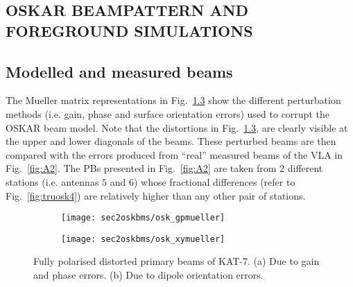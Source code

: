 \begin{appendices}
 

\chapter{OSKAR BEAMPATTERN AND FOREGROUND SIMULATIONS} %
\label{appendix:A1}
\section{Modelled and measured beams}  \label{sec:A}

The Mueller matrix representations in Fig.~\ref{fig:A1} show the  different perturbation methods (i.e. gain, phase and surface orientation errors) used to corrupt the OSKAR beam model. Note that the distortions in Fig.~\ref{fig:A1}, are clearly visible at the upper and lower diagonals of the beams.
These perturbed beams are then compared with the errors produced from \enquote{real} measured beams of the VLA in Fig.~\ref{fig:A2}. %
The PBs presented in Fig.~\ref{fig:A2} are taken from 2 different stations (i.e. antennas $5$ and $6$) whose fractional differences (refer to Fig.~\ref{fig:truosk4}) 
are relatively higher than any other pair of stations.


 \begin{figure}
 \begin{minipage}[!b]{\linewidth}
  \centering
     \begin{subfigure}[b]{0.8\textwidth}
                \texttt{[image: sec2oskbms/osk\_gpmueller]}
                \caption{}
                \label{fig:A1a}
        \end{subfigure}
        \begin{subfigure}[b]{0.8\textwidth}
                \texttt{[image: sec2oskbms/osk\_xymueller]}
                \caption{}
               \label{fig:A1b}
        \end{subfigure}
         \end{minipage}
        \caption{Fully polarised distorted primary beams of KAT-7. (a) Due to gain and phase errors.  (b) Due to dipole orientation errors.}
	    \label{fig:A1}
  \end{figure}
  \FloatBarrier



\end{appendices}
